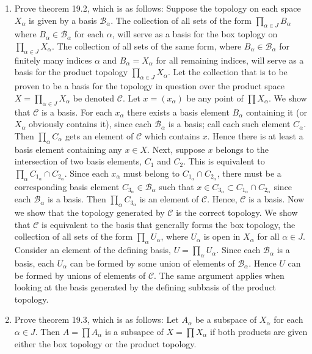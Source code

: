 \documentclass[12pt,letterpaper]{article}
\begin{document}
\RaggedRight
\begin{enumerate}
  \item Prove theorem 19.2, which is as follows: Suppose the topology on each space $X_\alpha$ is given by a basis $\mathcal{B}_\alpha$. The collection of all sets of the form $\prod_{\alpha\in J}B_\alpha$ where $B_\alpha \in \mathcal{B}_\alpha$ for each $\alpha$, will serve as a basis for the box toplogy on $\prod_{\alpha\in J} X_\alpha$. The collection of all sets of the same form, where $B_\alpha \in \mathcal{B}_\alpha$ for finitely many indices $\alpha$ and $B_\alpha=X_\alpha$ for all remaining indices, will serve as a basis for the product topology $\prod_{\alpha\in J}X_\alpha$.\hspace{5in}\n
  \indent Let the collection that is to be proven to be a basis for the topology in question over the product space $X=\prod_{\alpha\in J}X_\alpha$ be denoted $\mathcal{C}$. Let $x=(x_\alpha)$ be any point of $\prod X_\alpha$. We show that $\mathcal{C}$ is a basis. \n
  \indent For each $x_\alpha$ there exists a basis element $B_\alpha$ containing it (or $X_\alpha$ obviously contains it), since each $\mathcal{B}_\alpha$ is a basis; call each such element $C_\alpha$. Then $\prod_\alpha C_\alpha$ gets an element of $\mathcal{C}$ which contains $x$. Hence there is at least a basis element containing any $x\in X$.
  Next, suppose $x$ belongs to the intersection of two basis elements, $C_1$ and $C_2$. This is equivalent to $\prod_\alpha C_{1_\alpha} \cap C_{2_\alpha}$. Since each $x_\alpha$ must belong to $C_{1_\alpha} \cap C_{2_\alpha}$, there must be a corresponding basis element $C_{3_\alpha}\in\mathcal{B}_\alpha$ such that $x\in C_{3_\alpha}\subset C_{1_\alpha} \cap C_{2_\alpha}$ since each $\mathcal{B}_\alpha$ is a basis. Then $\prod_\alpha C_{3_\alpha}$ is an element of $\mathcal{C}$. Hence, $\mathcal{C}$ is a basis.\n
  \indent Now we show that the topology generated by $\mathcal{C}$ is the correct topology.
  We show that $\mathcal{C}$ is equivalent to the basis that generally forms the box topology, the collection of all sets of the form $\prod_\alpha U_\alpha$, where $U_\alpha$ is open in $X_\alpha$ for all $\alpha\in J$. Consider an element of the defining basis, $U=\prod_\alpha U_\alpha$. Since each $\mathcal{B}_\alpha$ is a basis, each $U_\alpha$ can be formed by some union of elements of $\mathcal{B}_\alpha$. Hence $U$ can be formed by unions of elements of $\mathcal{C}$. The same argument applies when looking at the basis generated by the defining subbasis of the product topology.
  \item Prove theorem 19.3, which is as follows: Let $A_\alpha$ be a subspace of $X_\alpha$ for each $\alpha \in J$. Then $A=\prod A_\alpha$ is a subsapce of $X=\prod X_\alpha$ if both products are given either the box topology or the product topology.\hspace{5in}\n

\end{enumerate}
\end{document}
